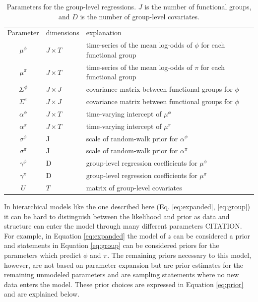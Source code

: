 \documentclass[12pt,letterpaper]{article}
\begin{document}
\begin{table}
  \centering
  \caption{Parameters for the group-level regressions. \(J\) is the number of functional groups, and \(D\) is the number of group-level covariates. }
  \begin{tabular}{c l l}
    Parameter & dimensions & explanation \\
    \(\mu^{\phi}\) & \(J \times T\) & time-series of the mean log-odds of \(\phi\) for each functional group \\
    \(\mu^{\pi}\) & \(J \times T\) & time-series of the mean log-odds of \(\pi\) for each functional group \\ 
    \(\Sigma^{\phi}\) & \(J \times J\) & covariance matrix between functional groups for \(\phi\) \\
    \(\Sigma^{\pi}\) & \(J \times J\) & covariance matrix between functional groups for \(\phi\) \\
    \(\alpha^{\phi}\) & \(J \times T\) & time-varying intercept of \(\mu^{\phi}\) \\
    \(\alpha^{\pi}\) & \(J \times T\) & time-varying intercept of \(\mu^{\pi}\) \\
    \(\sigma^{\phi}\) & J & scale of random-walk prior for \(\alpha^{\phi}\) \\
    \(\sigma^{\pi}\) & J & scale of random-walk prior for \(\alpha^{\pi}\) \\
    \(\gamma^{\phi}\) & D & group-level regression coefficients for \(\mu^{\phi}\) \\
    \(\gamma^{\pi}\) & D & group-level regression coefficients for \(\mu^{\pi}\) \\
    \(U\) & \(T\) & matrix of group-level covariates \\
    \hline
  \end{tabular}
  \label{tab:group}
\end{table}

In hierarchical models like the one described here (Eq. \ref{eq:expanded}, \ref{eq:group}) it can be hard to distinguish between the likelihood and prior as data and structure can enter the model through many different parameters CITATION. For example, in Equation \ref{eq:expanded} the model of \(z\) can be considered a prior and statements in Equation \ref{eq:group} can be considered priors for the parameters which predict \(\phi\) and \(\pi\). The remaining priors necessary to this model, however, are not based on parameter expansion but are prior estimates for the remaining unmodeled parameters and are sampling statements where no new data enters the model. These prior choices are expressed in Equation \ref{eq:prior} and are explained below.
\end{document}
